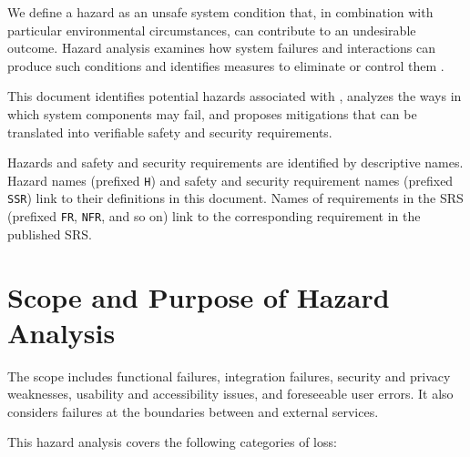 \documentclass{article}
\begin{document}
We define a hazard as an unsafe system condition that, in combination with particular environmental circumstances, can
contribute to an undesirable outcome. Hazard analysis examines how system failures and interactions can produce such
conditions and identifies measures to eliminate or control them \citep{IppolitoAndWallace1995,Leveson2011}.

This document identifies potential hazards associated with \projname{}, analyzes the ways in which system components may
fail, and proposes mitigations that can be translated into verifiable safety and security requirements.

    Hazards and safety and security requirements are identified by descriptive names. Hazard names (prefixed \texttt{H\textunderscore}) and
    safety and security requirement names (prefixed \texttt{SSR\textunderscore}) link to their definitions in this document.
    Names of requirements in the SRS (prefixed \texttt{FR\textunderscore}, \texttt{NFR\textunderscore}, and so on)
    link to the corresponding requirement in the published SRS.

    \section{Scope and Purpose of Hazard Analysis}


The scope includes functional failures, integration failures, security and privacy weaknesses, usability and
accessibility issues, and foreseeable user errors. It also considers failures at the boundaries between \projname{}
and external services.

This hazard analysis covers the following categories of loss:
\end{document}

